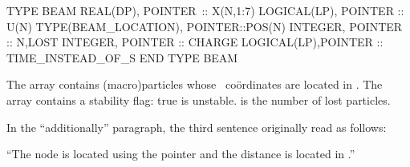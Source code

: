 \begin{ptccode}
TYPE BEAM
  REAL(DP), POINTER~:: X(N,1:7)
  LOGICAL(LP), POINTER :: U(N)
  TYPE(BEAM_LOCATION), POINTER::POS(N)
  INTEGER, POINTER :: N,LOST
  INTEGER, POINTER :: CHARGE
  LOGICAL(LP),POINTER :: TIME_INSTEAD_OF_S
END TYPE BEAM
\end{ptccode}

The array  contains  (macro)particles whose \PTC\
co\"ordinates are located in . The array  contains
a stability flag: true is unstable. \ptc{LOST} is the number of lost particles.

In the ``additionally'' paragraph, the third sentence originally read as follows:

``The node is located using the pointer  and the distance
is located in \ptc{X(N,7)}.''

\endinput
